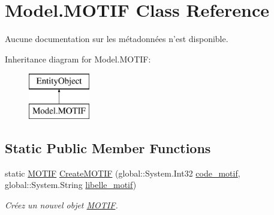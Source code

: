 \hypertarget{class_model_1_1_m_o_t_i_f}{\section{Model.\-M\-O\-T\-I\-F Class Reference}
\label{class_model_1_1_m_o_t_i_f}
}


Aucune documentation sur les métadonnées n'est disponible.  


Inheritance diagram for Model.\-M\-O\-T\-I\-F\-:\begin{figure}[H]
\begin{center}
\leavevmode
\includegraphics[height=2.000000cm]{class_model_1_1_m_o_t_i_f}
\end{center}
\end{figure}
\subsection*{Static Public Member Functions}
\begin{DoxyCompactItemize}
\item 
static \hyperlink{class_model_1_1_m_o_t_i_f}{M\-O\-T\-I\-F} \hyperlink{class_model_1_1_m_o_t_i_f_a0a7644d2e98b8191ea1b65d8a5500c9b}{Create\-M\-O\-T\-I\-F} (global\-::\-System.\-Int32 \hyperlink{class_model_1_1_m_o_t_i_f_a72c3259738d73e8c4ab96d046c7fd5a9}{code\-\_\-motif}, global\-::\-System.\-String \hyperlink{class_model_1_1_m_o_t_i_f_a72046bb40be3fd2da573e935fb49a81b}{libelle\-\_\-motif})
\begin{DoxyCompactList}\small\item\em Créez un nouvel objet \hyperlink{class_model_1_1_m_o_t_i_f}{M\-O\-T\-I\-F}. \end{DoxyCompactList}\end{DoxyCompactItemize}
